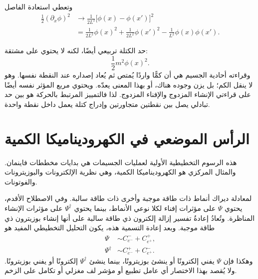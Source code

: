 \begin{classroomqa}
\end{classroomqa}

وتعطي استعادة الفاصل
\begin{align}
\frac12(\partial_x\phi)^2
&\longrightarrow
\frac{1}{2L^2}\bigl[\phi(x)-\phi(x')\bigr]^2
\\
&=
\frac{1}{2L^2}\phi(x)^2
+\frac{1}{2L^2}\phi(x')^2
-\frac{1}{L^2}\phi(x)\phi(x').
\end{align}

حد الكتلة تربيعي أيضًا، لكنه لا يحتوي على مشتقة:
\begin{equation}
\frac12m^2\phi(x)^2.
\end{equation}
وقراءته أحادية الجسيم هي أن كمًّا واردًا يُمتص ثم يُعاد إصداره عند النقطة نفسها. وهو لا ينقل الكم؛ بل يزن وجوده هناك، أو بهذا المعنى يعدّه. ويحتوي مربع المؤثر نفسه أيضًا على قراءتي الإنشاء المزدوج والإفناء المزدوج. لذا فالتمييز المرتبط بالحركة هو بين حد تبادلي يصل بين نقطتين متجاورتين وإدراج كتلة يعمل داخل نقطة واحدة.

\section{الرأس الموضعي في الكهروديناميكا الكمية}

هذه الرسوم التخطيطية الأولية لعمليات الجسيمات هي بدايات مخططات فاينمان. والمثال المركزي هو الكهروديناميكا الكمية، وهي نظرية الإلكترونات والبوزيترونات والفوتونات.

لمعادلة ديراك أنماط ذات طاقة موجبة وأخرى ذات طاقة سالبة. وفي الاصطلاح الأقدم، يحتوي \(\Psi\) على مؤثرات إفناء لكلا نوعي الأنماط، بينما يحتوي \(\Psi^\dagger\) على مؤثرات الإنشاء المناظرة. وتُعادُ إعادةُ تفسير إزالة إلكترون ذي طاقة سالبة على أنها إنشاء بوزيترون ذي طاقة موجبة. وبعد إعادة التسمية هذه، يكون التحليل التخطيطي المفيد هو
\begin{align}
\Psi
&\sim
C^-_{e^-}+C^+_{e^+},
\\
\Psi^\dagger
&\sim
C^+_{e^-}+C^-_{e^+}.
\end{align}
وهكذا فإن \(\Psi\) يفني إلكترونًا أو ينشئ بوزيترونًا، بينما ينشئ \(\Psi^\dagger\) إلكترونًا أو يفني بوزيترونًا. ولا يُقصد بهذا الاختصار أي عامل تطبيع أو مؤشر لف مغزلي أو تكامل على الزخم.

